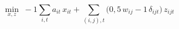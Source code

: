 \begin{equation}
\min_{x,z}\; -1 \sum_{i,t} a_{it}\, x_{it} + \sum_{(i,j),t}\big(0{,}5\, w_{ij} - 1\, \delta_{ijt}\big)\, z_{ijt}
\end{equation}
